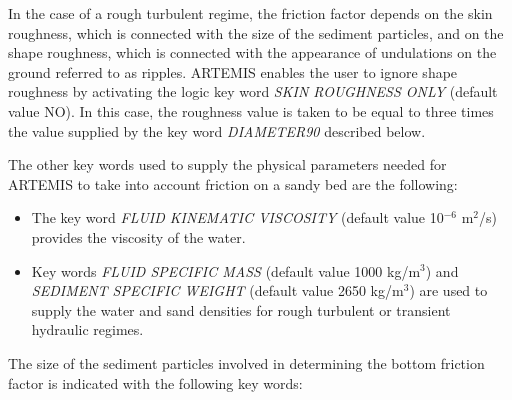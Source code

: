 In the case of a rough turbulent regime, the friction factor depends on the
skin roughness, which is connected with the size of the sediment particles, and
on the shape roughness, which is connected with the appearance of undulations
on the ground referred to as ripples. ARTEMIS enables the user to ignore shape
roughness by activating the logic key word \textit{SKIN ROUGHNESS ONLY}
(default value NO). In this case, the roughness value is taken to be equal to
three times the value supplied by the key word \textit{DIAMETER90} described
below.

The other key words used to supply the physical parameters needed for ARTEMIS
to take into account friction on a sandy bed are the following:

\begin{itemize}
\item  The key word \textit{FLUID KINEMATIC VISCOSITY} (default value
  10${}^{-6}$ m${}^{2}$/s) provides the viscosity of the water.

\item  Key words \textit{FLUID SPECIFIC MASS }(default value 1000 kg/m${}^{3}$)
  and \textit{SEDIMENT SPECIFIC WEIGHT }(default value 2650 kg/m${}^{3}$) are
    used to supply the water and sand densities for rough turbulent or
    transient hydraulic regimes.
\end{itemize}

The size of the sediment particles involved in determining the bottom friction
factor is indicated with the following key words:

